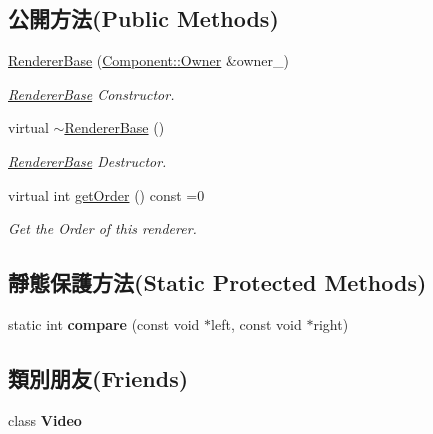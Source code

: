 \subsection*{公開方法(Public Methods)}
\begin{DoxyCompactItemize}
\item 
\hyperlink{class_i_dream_sky_1_1_renderer_base_aa3b9e785717f998801d7ca13cc9d23be}{Renderer\+Base} (\hyperlink{class_i_dream_sky_1_1_component_1_1_owner}{Component\+::\+Owner} \&owner\+\_\+)
\begin{DoxyCompactList}\small\item\em \hyperlink{class_i_dream_sky_1_1_renderer_base}{Renderer\+Base} Constructor. \end{DoxyCompactList}\item 
virtual \hyperlink{class_i_dream_sky_1_1_renderer_base_a5225d642bfea54badfaa3f7a503a2de1}{$\sim$\+Renderer\+Base} ()
\begin{DoxyCompactList}\small\item\em \hyperlink{class_i_dream_sky_1_1_renderer_base}{Renderer\+Base} Destructor. \end{DoxyCompactList}\item 
virtual int \hyperlink{class_i_dream_sky_1_1_renderer_base_a1d42485cc8784051956f25df6c78b6d5}{get\+Order} () const  =0
\begin{DoxyCompactList}\small\item\em Get the Order of this renderer. \end{DoxyCompactList}\end{DoxyCompactItemize}
\subsection*{靜態保護方法(Static Protected Methods)}
\begin{DoxyCompactItemize}
\item 
static int {\bfseries compare} (const void $\ast$left, const void $\ast$right)\hypertarget{class_i_dream_sky_1_1_renderer_base_ac3c20e039f761bf43637d6474bde3e87}{}\label{class_i_dream_sky_1_1_renderer_base_ac3c20e039f761bf43637d6474bde3e87}

\end{DoxyCompactItemize}
\subsection*{類別朋友(Friends)}
\begin{DoxyCompactItemize}
\item 
class {\bfseries Video}\hypertarget{class_i_dream_sky_1_1_renderer_base_a525039adce643855a9564c856c2cf3d1}{}\label{class_i_dream_sky_1_1_renderer_base_a525039adce643855a9564c856c2cf3d1}

\end{DoxyCompactItemize}


